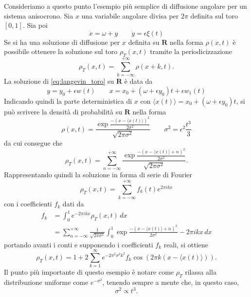 \documentclass[10pt,a4paper]{article}
\begin{document}
Consideriamo a questo punto l'esempio più semplice di diffusione angolare per un sistema anisocrono. Sia \(x\) una variabile angolare divisa per \(2\pi\) definita sul toro \([0, 1]\). Sia poi
\begin{equation}
	\dot{x} = \omega + y \quad\quad \dot{y} = \epsilon\xi(t)
	\label{eq:langevin_toro}
\end{equation}
Se si ha una soluzione di diffusione per \(x\) definita su \(\mathbf{R}\) nella forma \(\rho(x,t)\) è possibile ottenere la soluzione sul toro \(\rho_T(x,t)\) tramite la periodicizzazione
\begin{equation}
	\rho_T(x,t) = \sum_{k=-\infty}^{+\infty} \rho(x+k,t).
\end{equation}
La soluzione di \eqref{eq:langevin_toro} su \(\mathbf{R}\) è data da
\begin{equation}
	y = y_0 + \epsilon w(t) \quad\quad x = x_0 + (\omega + \epsilon y_0) t + \epsilon w_1(t)
\end{equation}
Indicando quindi la parte deterministica di \(x\) con \(\langle x(t) \rangle = x_0 + (\omega + \epsilon y_0) t\), si può scrivere la densità di probabilità su \(\mathbf{R}\) nella forma
\begin{equation}
	\rho(x,t) = \frac{\exp{\frac{-(x-\langle x(t)\rangle)^2}{2\sigma^2}}}{\sqrt{2\pi\sigma^2}} \quad\quad \sigma^2 = \epsilon^2 \frac{t^3}{3}
\end{equation}
da cui consegue che
\begin{equation}
	\rho_T(x,t) = \sum_{n=-\infty}^{+\infty} \frac{\exp{\frac{-(x-\langle x(t)\rangle + n)^2}{2\sigma^2}}}{\sqrt{2\pi\sigma^2}}.
\end{equation}
Rappresentando quindi la soluzione in forma di serie di Fourier
\begin{equation}
	\rho_T(x,t) = \sum_{k=-\infty}^{+\infty} f_k(t)e^{2\pi i k x}
\end{equation}
con i coefficienti \(f_k\) dati da
\begin{align}
	f_k &= \int_0^1 e^{-2\pi i k x} \rho_T(x,t)\,dx \\
	&= \sum_{n=-\infty}^{+\infty} \frac{1}{\sqrt{2\pi\sigma^2}} \int_0^1 \exp{\frac{-(x-\langle x(t) \rangle + n)^2}{2\sigma^2} -2\pi i k x}\,dx
\end{align}
portando avanti i conti e supponendo i coefficienti \(f_k\) reali, si ottiene
\begin{equation}
	\rho_T(x,t) = 1+2\sum_{k=1}^\infty e^{-2\pi^2\sigma^2k^2} f_k \cos(2\pi k (x-\langle x(t) \rangle)).
\end{equation}
Il punto più importante di questo esempio è notare come \(\rho_T\) rilassa alla distribuzione uniforme come \(e^{-\sigma^2}\), tenendo sempre a mente che, in questo caso,
\begin{equation}
	\sigma^2 \propto t^{3}.
\end{equation}
\end{document}
